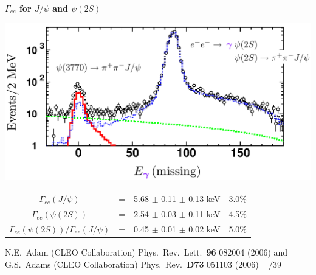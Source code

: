\documentclass[landscape]{article}
\newenvironment{slide}[1][ ]{}{\mbox{ } \hfill \arabic{page}/39 \pagebreak}
\begin{document}
\begin{slide}
{\Huge \bf \boldmath $\Gamma_{ee}$ for $J/\psi$ and $\psi(2S)$}

\begin{center}
\includegraphics[width=0.8\linewidth]{psi_gamee2}

\vfill
\renewcommand{\arraystretch}{1.4}
\begin{tabular}{c c c c}
  \boldmath $\Gamma_{ee}(J/\psi)$ & \mbox{\hspace{0.25 cm}} = \mbox{\hspace{0.25 cm}} & 5.68 $\pm$ 0.11 $\pm$ 0.13 keV & \mbox{\hspace{0.5 cm}} 3.0\% \mbox{\hspace{0.5 cm}} \\
  \boldmath $\Gamma_{ee}(\psi(2S))$ & = & 2.54 $\pm$ 0.03 $\pm$ 0.11 keV & 4.5\% \\

  \boldmath $\Gamma_{ee}(\psi(2S))/\Gamma_{ee}(J/\psi)$ & = & 0.45 $\pm$ 0.01 $\pm$ 0.02 keV & 5.0\% \\
\end{tabular}
\end{center}

\vfill
{\Large
N.E.~Adam (CLEO Collaboration) Phys.\ Rev.\ Lett.\ {\bf 96} 082004
(2006) and \\ G.S.~Adams (CLEO Collaboration) Phys.\ Rev.\ {\bf D73}
051103 (2006)}
\end{slide}

\end{document}
